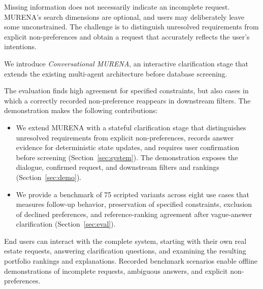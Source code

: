 \documentclass[sigconf,review]{acmart}
\newcommand{\nb}[3]{
        {\color{#1}\fbox{\bfseries\sffamily\scriptsize#2}
            {\sf\small$\blacktriangleright$\textit{#3}$\blacktriangleleft$}
        }
   }
\newcommand{\nb}[3]{}
\newcommand\SIMONE[1]{\nb{teal}{SIMONE}{#1}}
\begin{document}
Missing information does not necessarily indicate an incomplete request. MURENA's search dimensions are optional, and users may deliberately leave some unconstrained. The challenge is to distinguish unresolved requirements from explicit non-preferences and obtain a request that accurately reflects the user's intentions.

We introduce \emph{Conversational MURENA}, an interactive clarification stage that extends the existing multi-agent architecture before database screening. 

The evaluation finds high agreement for specified constraints, but also cases in which a correctly recorded non-preference reappears in downstream filters.
The demonstration makes the following contributions:
\begin{itemize}
    \item 
    We extend MURENA with a stateful clarification stage that distinguishes unresolved requirements from explicit non-preferences, records answer evidence for deterministic state updates, and requires user confirmation before screening (Section~\ref{sec:system}). The demonstration exposes the dialogue, confirmed request, and downstream filters and rankings (Section~\ref{sec:demo}).

    \item 
    We provide a benchmark of 75 scripted variants across eight use cases that measures follow-up behavior, preservation of specified constraints, exclusion of declined preferences, and reference-ranking agreement after vague-answer clarification (Section~\ref{sec:eval}).
\end{itemize}

End users can interact with the complete system, starting with their own real estate requests, answering clarification questions, and examining the resulting portfolio rankings and explanations. Recorded benchmark scenarios enable offline demonstrations of incomplete requests, ambiguous answers, and explicit non-preferences.
\end{document}
